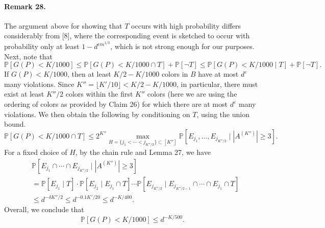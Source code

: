 \documentclass[10pt,a4paper]{article}
\begin{document}
\paragraph{Remark 28.} The argument above for showing that $T$ occurs with high probability differs considerably from [8], where the corresponding event is sketched to occur with probability only at least $1-d^{cm^{1/3}}$, which is not strong enough for our purposes.
Next, note that
\[\mathbb P[G(P)<K/1000]\leq\mathbb P[G(P)<K/1000\cap T]+\mathbb P[\neg T]\leq\mathbb P[G(P)<K/1000\mid T]+\mathbb P[\neg T].\]
If $G(P)<K/1000$, then at least $K/2-K/1000$ colors in $B$ have at most $d^\varepsilon$ many violations. Since $K''=\lfloor K'/10\rfloor<K/2-K/1000$, in particular, there must exist at least $K''/2$ colors within the first $K''$ colors (here we are using the ordering of colors as provided by Claim 26) for which there are at most $d^\varepsilon$ many violations. We then obtain the following by conditioning on $T$, using the union bound.
\[\mathbb P[G(P)<K/1000\cap T]\leq2^{K''}\max_{H=\{j_1<\cdots<j_{K''/2}\}\subset[K'']}\mathbb P[E_{j_1},\ldots,E_{j_{K''/2}}\mid|A^{(K'')}|\geq3].\]
For a fixed choice of $H$, by the chain rule and Lemma 27, we have
\begin{align*}
&\mathbb P[E_{j_1}\cap\cdots\cap E_{j_{K''/2}}\mid|A^{(K'')}|\geq3]\\
&=\mathbb P[E_{j_1}\mid T]\cdot\mathbb P[E_{j_2}\mid E_{j_1}\cap T]\cdots\mathbb P[E_{j_{K''/2}}\mid E_{j_{K''/2-1}}\cap\cdots\cap E_{j_1}\cap T]\\
&\leq d^{-\delta K''/2}\leq d^{-0.1K'/20}\leq d^{-K/400}.
\end{align*}
Overall, we conclude that
\[\mathbb P[G(P)<K/1000]\leq d^{-K/500}.\]
\end{document}
